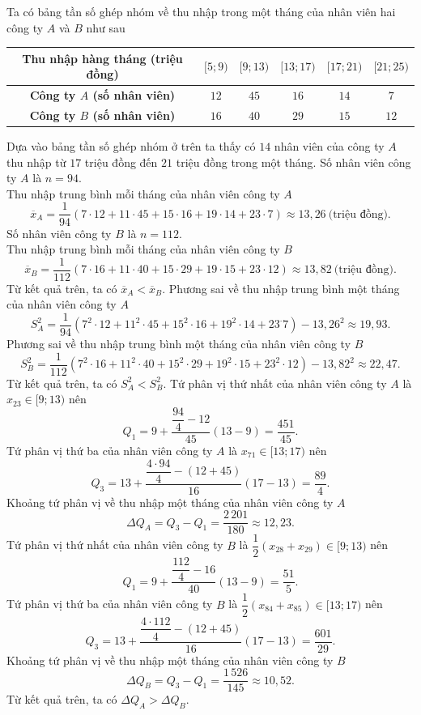 \begin{ex}
{Ta có bảng tần số ghép nhóm về thu nhập trong một tháng của nhân viên hai công ty $A$ và $B$ như sau
\begin{longtable}{|c|c|c|c|c|c|}
\hline
\textbf{Thu nhập hàng tháng (triệu đồng)}&$[5;9)$&$[9;13)$&$[13;17)$&$[17;21)$&$[21;25)$\\
\hline
\textbf{Công ty $A$ (số nhân viên)}&$12$&$45$&$16$&$14$&$7$\\
\hline
\textbf{Công ty $B$ (số nhân viên)}&$16$&$40$&$29$&$15$&$12$\\
\hline
\end{longtable}\vspace{-5mm}
\begin{itemchoice}
\itemch Dựa vào bảng tần số ghép nhóm ở trên ta thấy có $14$ nhân viên của công ty $A$ thu nhập từ $17$ triệu đồng đến $21$ triệu đồng trong một tháng.
\itemch Số nhân viên công ty $A$ là $n=94$.\\
Thu nhập trung bình mỗi tháng của nhân viên công ty $A$
$$\overline{x}_A=\dfrac{1}{94}\left(7\cdot 12+11\cdot 45+15\cdot 16+19\cdot 14+23\cdot 7 \right)\approx13{,}26~\text{(triệu đồng).}$$
Số nhân viên công ty $B$ là $n=112$.\\
Thu nhập trung bình mỗi tháng của nhân viên công ty $B$
$$\overline{x}_B=\dfrac{1}{112}\left(7\cdot 16+11\cdot 40+15\cdot 29+19\cdot 15+23\cdot 12 \right)\approx 13{,}82~\text{(triệu đồng).}$$
Từ kết quả trên, ta có $\overline{x}_A<\overline{x}_B$.
\itemch 
Phương sai về thu nhập trung bình một tháng của nhân viên công ty $A$ $$S^2_A=\dfrac{1}{94}\left(7^2\cdot 12+11^2\cdot 45+15^2\cdot 16+19^2\cdot 14+23^\cdot 7 \right)-13{,}26^2\approx 19{,}93.$$
Phương sai về thu nhập trung bình một tháng của nhân viên công ty $B$ $$S^2_B=\dfrac{1}{112}\left(7^2\cdot 16+11^2\cdot 40+15^2\cdot 29+19^2\cdot 15+23^2\cdot 12 \right)-13{,}82^2\approx 22{,}47.$$
Từ kết quả trên, ta có $S^2_A<S^2_B$.
\itemch Tứ phân vị thứ nhất của nhân viên công ty $A$ là $x_{23}\in [9;13)$	nên $$Q_1=9+\dfrac{\dfrac{94}{4}-12}{45}(13-9)=\dfrac{451}{45}.$$
Tứ phân vị thứ ba của nhân viên công ty $A$ là $x_{71}\in [13;17)$	nên $$Q_3=13+\dfrac{\dfrac{4\cdot94}{4}-(12+45)}{16}(17-13)=\dfrac{89}{4}.$$
Khoảng tứ phân vị về thu nhập một tháng của nhân viên công ty $A$ $$\Delta Q_A=Q_3-Q_1=\dfrac{2\,201}{180}\approx 12{,}23.$$
Tứ phân vị thứ nhất của nhân viên công ty $B$ là $\dfrac{1}{2}\left( x_{28}+x_{29}\right) \in [9;13)$	nên $$Q_1=9+\dfrac{\dfrac{112}{4}-16}{40}(13-9)=\dfrac{51}{5}.$$
Tứ phân vị thứ ba của nhân viên công ty $B$ là $\dfrac{1}{2}\left( x_{84}+x_{85}\right) \in [13;17)$	nên $$Q_3=13+\dfrac{\dfrac{4\cdot112}{4}-(12+45)}{16}(17-13)=\dfrac{601}{29}.$$
Khoảng tứ phân vị về thu nhập một tháng của nhân viên công ty $B$ $$\Delta Q_B=Q_3-Q_1=\dfrac{1\,526}{145}\approx 10{,}52.$$	
Từ kết quả trên, ta có $\Delta Q_A>\Delta Q_B$.
\end{itemchoice}
}
\end{ex}

